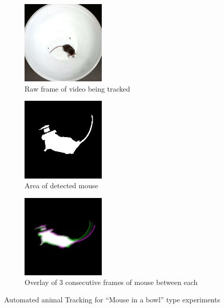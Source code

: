 \begin{figure}[htb]
	\begin{subfigure}[t]{0.32\linewidth}\centering
		\includegraphics[width=4cm]{figures/01raw.jpg}
		\caption{Raw frame of video being tracked}
	\end{subfigure}
	\hfill
	\begin{subfigure}[t]{0.32\linewidth}\centering
		\includegraphics[width=4cm]{figures/02black-and-white.jpg}
		\caption{Area of detected mouse}
	\end{subfigure}
	\begin{subfigure}[t]{0.32\linewidth}\centering
		\includegraphics[width=4cm]{figures/03twoframes.jpg}
		\caption{Overlay of 3 consecutive frames of mouse between each}
	\end{subfigure}
	\caption{Automated animal Tracking for ``Mouse in a bowl'' type experiments }
	\label{fig:mouse-in-bowl-1}
\end{figure}


